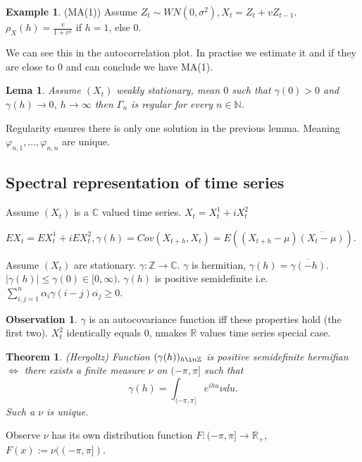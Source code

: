 \documentclass[12pt,a4paper]{amsart}
\theoremstyle{definition} %
\newtheorem{example}[defn]{Example}
\newtheorem{observation}[defn]{Observation}
\theoremstyle{plain} %
\newtheorem{lema}[defn]{Lema}
\newtheorem{theorem}[defn]{Theorem}
\newcommand{\R}{\mathbb R}
\newcommand{\N}{\mathbb N}
\newcommand{\Z}{\mathbb Z}
\newcommand{\C}{\mathbb C}
\begin{document}
\begin{example} (MA(1))
Assume $Z_t \sim WN(0, \sigma^2), X_t = Z_t + v Z_{t-1}$.
$\rho_X(h) = \frac{v}{1+v^2}$ if $h = 1$, else $0$.

We can see this in the autocorrelation plot. In practise we estimate it and if they are close to $0$ and can conclude we have MA(1). 
\end{example}

\begin{lema}
Assume $(X_t)$ weakly stationary, mean $0$ such that $\gamma(0) > 0$ and $\gamma(h) \rightarrow 0$, $h \rightarrow \infty$ then $\Gamma_n$ is regular for every $n \in \N$. 
\end{lema}

Regularity ensures there is only one solution in the previous lemma. Meaning $\varphi_{n,1}, \dots, \varphi_{n,n}$ are unique. 


\subsection{Spectral representation of time series}

Assume $(X_t)$ is a $\C$ valued time series.
$X_t = X_t^1 + i X_t^2$

$EX_t = EX_t^1 + i EX_t^2, \gamma(h) = Cov(X_{t+h}, X_t) = E((X_{t+h} - \mu)\overline{(X_t - \mu)})$.

Assume $(X_t)$ are stationary. $\gamma: \Z \rightarrow \C$. $\gamma$ is hermitian, $\gamma(h) = \overline{\gamma(-h)}$. $|\gamma(h)| \leq \gamma(0) \in [0, \infty)$. $\gamma(h)$ is positive semidefinite i.e.
$\sum_{i,j = 1}^n \alpha_i \gamma(i-j)\overline{\alpha_j} \geq 0$.

\begin{observation}
$\gamma$ is an autocovariance function iff these properties hold (the first two).
$X_t^2$ identically equals $0$, nmakes $\R$ values time series special case. 
\end{observation}

\begin{theorem} (Hergoltz)
Function $(\gamma(h))_{h \i n\Z}$ is positive semidefinite hermifian $\Leftrightarrow$ there exists a finite measure $\nu$ on $(-\pi, \pi]$ such that $$\gamma(h) = \int_{(-\pi,\pi]} e^{i h u}\nu du.$$ 
Such a $\nu$ is unique.
\end{theorem}

Observe $\nu$ has its own distribution function $F : (-\pi, \pi] \rightarrow \R_+$, $F(x) := \nu((-\pi,\pi])$. 
\end{document}
